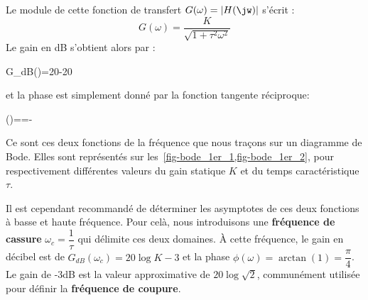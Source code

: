 Le module de cette fonction de transfert $G(\omega) =|H(\jw)|$ s'écrit :
$$G(\omega)=\dfrac{K}{\sqrt{1+\tau^2\omega^2}}$$
Le gain en dB s'obtient alors par :
\begin{bequation}
    G_{dB}(\omega)=20-20\label{eq-gain_1er}
\end{bequation}
et la phase est simplement donné par la fonction tangente réciproque:
\begin{bequation}
    \phi(\omega)==-\arctan{(\tau\omega)}\label{eq-phase_1er} 
\end{bequation}
Ce sont ces deux fonctions de la fréquence que nous traçons sur un diagramme
de Bode. Elles sont représentés sur les~\cref{fig-bode_1er_1,fig-bode_1er_2}, 
pour respectivement différentes valeurs du gain statique $K$ et du temps 
caractéristique $\tau$.
\newline

Il est cependant recommandé de déterminer les asymptotes 
de ces deux fonctions à basse et haute fréquence. 
Pour celà, nous introduisons une \textbf{fréquence de cassure} 
$\omega_c=\dfrac{1}{\tau}$ qui délimite ces deux domaines.
\`A cette fréquence, le gain en décibel est de $G_{dB}(\omega_c)=20\log{K}-3$ 
et la phase $\phi(\omega)=\arctan{(1)}=\dfrac{\pi}{4}$.
Le gain de -3dB est la valeur approximative de $20\log{\sqrt{2}}$, communément
utilisée pour définir la \textbf{fréquence de coupure}.

